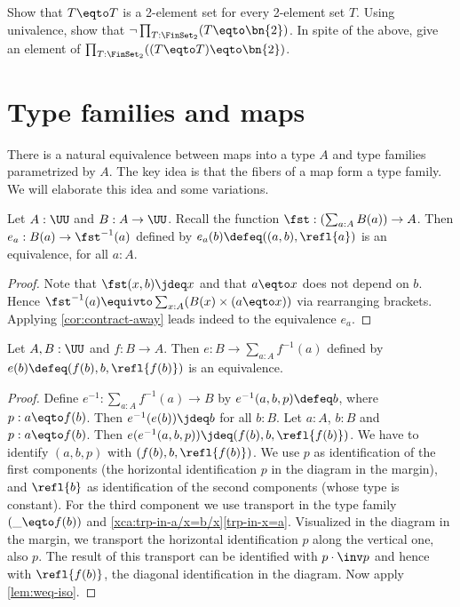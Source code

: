 \begin{xca}\label{xca:2-element-sets}
Show that $T\eqto T$ is a 2-element set for every 2-element set $T$.
Using univalence, show that $\neg\prod_{T:\FinSet_2}(T\eqto\bn{2})$.
In spite of the above, give an element of
$\prod_{T:\FinSet_2}((T\eqto T)\eqto\bn{2})$.
\end{xca}

\section{Type families and maps}
\label{sec:typefam}

There is a natural equivalence between maps into a type $A$
and type families parametrized by $A$. The key idea is that the
fibers of a map form a type family. We will elaborate this
idea and some variations.


\begin{lemma}\label{lem:fst-fiber(a)=B(a)}
Let $A:\UU$ and $B:A\to\UU$.
Recall the function $\fst: (\sum_{a:A} B(a))\to A$.
Then $e_a: B(a) \to \fst^{-1}(a)$ defined by
$e_a(b)\defeq ((a,b),\refl{a})$ is an equivalence,
for all $a:A$.
\end{lemma}
\begin{proof}
Note that $\fst(x,b)\jdeq x$ and that $a \eqto x$ does
not depend on $b$. Hence
$\fst^{-1}(a) \equivto \sum_{x:A}  (B(x) \times (a \eqto x))$
via rearranging brackets.
Applying \cref{cor:contract-away} leads indeed to
the equivalence $e_a$.
\end{proof}

\begin{lemma}\label{lem:sum-of-fibers}
Let $A,B:\UU$ and $f:B\to A$.
Then $e: B \to \sum_{a:A} f^{-1}(a)$ defined by
$e(b)\defeq (f(b),b,\refl{f(b)})$ is an equivalence.
\end{lemma}
\begin{proof}
Define $e^{-1}: \sum_{a:A} f^{-1}(a) \to B$ by $e^{-1}(a,b,p)\defeq b$,
where $p: a\eqto f(b)$.
Then $e^{-1}(e(b))\jdeq b$ for all $b:B$.
Let $a:A$, $b:B$ and $p: a\eqto f(b) $.
Then $e(e^{-1}(a,b,p))\jdeq (f(b),b,\refl{f(b)})$.
We have to identify $(a,b,p)$ with $(f(b),b,\refl{f(b)})$.
We use $p$ as identification of the first components
(the horizontal identification $p$ in the diagram in the margin),
and $\refl{b}$ as identification of the second components
(whose type is constant). For the third component
we use transport in the type family $(\_ \eqto f(b))$
and \cref{xca:trp-in-a/x=b/x}\ref{trp-in-x=a}. Visualized
in the diagram in the margin, we transport
the horizontal identification $p$ along the vertical one, also $p$.
The result of this transport can be identified with $p\cdot\inv p$
and hence with $\refl{f(b)}$, the diagonal identification in the diagram.
Now apply \cref{lem:weq-iso}.
\end{proof}

